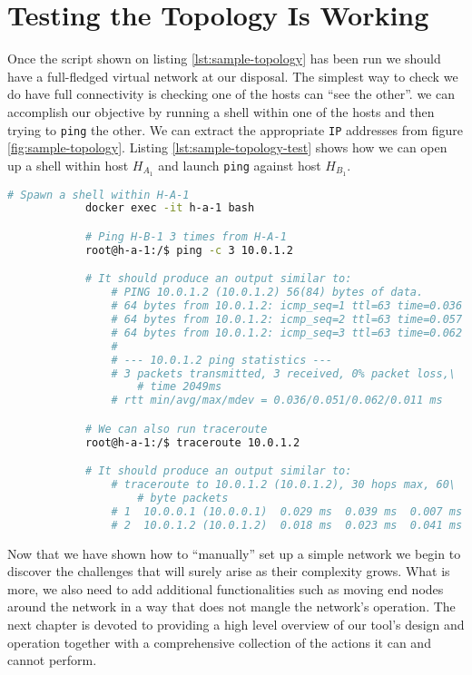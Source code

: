         

    \section{Testing the Topology Is Working}
        Once the script shown on listing \ref{lst:sample-topology} has been run we should have a full-fledged virtual network at our disposal. The simplest way to check we do have full connectivity is checking one of the hosts can ``see the other''. we can accomplish our objective by running a shell within one of the hosts and then trying to \texttt{ping} the other. We can extract the appropriate \texttt{IP} addresses from figure \ref{fig:sample-topology}. Listing \ref{lst:sample-topology-test} shows how we can open up a shell within host $H_{A_1}$ and launch \texttt{ping} against host $H_{B_1}$.\\

        \begin{lstlisting}[language = bash, caption = Testing the Sample Topology., label = lst:sample-topology-test]
            # Spawn a shell within H-A-1
            docker exec -it h-a-1 bash

            # Ping H-B-1 3 times from H-A-1
            root@h-a-1:/$ ping -c 3 10.0.1.2

            # It should produce an output similar to:
                # PING 10.0.1.2 (10.0.1.2) 56(84) bytes of data.
                # 64 bytes from 10.0.1.2: icmp_seq=1 ttl=63 time=0.036 ms
                # 64 bytes from 10.0.1.2: icmp_seq=2 ttl=63 time=0.057 ms
                # 64 bytes from 10.0.1.2: icmp_seq=3 ttl=63 time=0.062 ms
                #
                # --- 10.0.1.2 ping statistics ---
                # 3 packets transmitted, 3 received, 0% packet loss,\
                    # time 2049ms
                # rtt min/avg/max/mdev = 0.036/0.051/0.062/0.011 ms

            # We can also run traceroute
            root@h-a-1:/$ traceroute 10.0.1.2

            # It should produce an output similar to:
                # traceroute to 10.0.1.2 (10.0.1.2), 30 hops max, 60\
                    # byte packets
                # 1  10.0.0.1 (10.0.0.1)  0.029 ms  0.039 ms  0.007 ms
                # 2  10.0.1.2 (10.0.1.2)  0.018 ms  0.023 ms  0.041 ms
        \end{lstlisting}

    Now that we have shown how to ``manually'' set up a simple network we begin to discover the challenges that will surely arise as their complexity grows. What is more, we also need to add additional functionalities such as moving end nodes around the network in a way that does not mangle the network's operation. The next chapter is devoted to providing a high level overview of our tool's design and operation together with a comprehensive collection of the actions it can and cannot perform.
